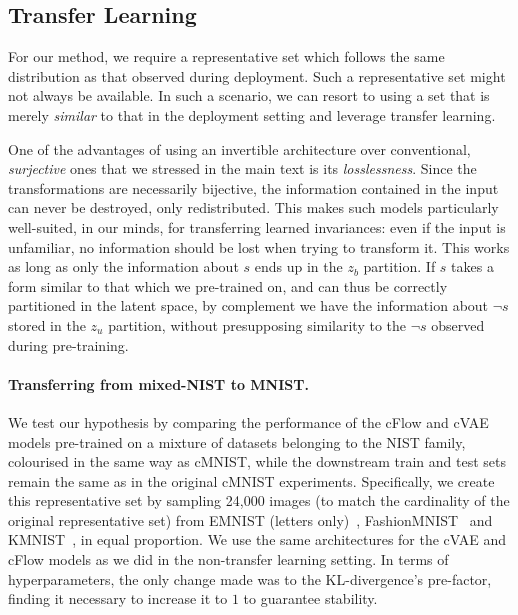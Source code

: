 \subsection{Transfer Learning}\label{sec:transfer-learning}
For our method, we require a representative set which follows the same distribution as that observed during deployment.
Such a representative set might not always be available.
In such a scenario, we can resort to using a set that is merely \emph{similar} to that in the deployment setting and leverage transfer learning.

One of the advantages of using an invertible architecture over conventional, \emph{surjective} ones that we stressed in the main text is its \emph{losslessness}. Since the transformations are necessarily bijective, the information contained in the input can never be destroyed, only redistributed. This makes such models particularly well-suited, in our minds, for transferring learned invariances:
even if the input is unfamiliar, no information should be lost when trying to transform it.
This works as long as only the information about $s$ ends up in the $z_b$ partition.
If $s$ takes a form similar to that which we pre-trained on, and can thus be correctly partitioned in the latent space, by complement we have the information about $\neg s$ stored in the $z_u$ partition, without presupposing similarity to the $\neg s$ observed during pre-training.

\paragraph{Transferring from mixed-NIST to MNIST.}
We test our hypothesis by comparing the performance of the cFlow and cVAE models pre-trained on a mixture of datasets belonging to the NIST family, colourised in the same way as cMNIST, while the downstream train and test sets remain the same as in the original cMNIST experiments. Specifically, we create this representative set by sampling 24,000 images (to match the cardinality of the original representative set) from EMNIST (letters only)~\cite{cohen2017emnist}, Fashion\-MNIST~\cite{xiao2017fashion} and KMNIST~\cite{clanuwat2018deep}, in equal proportion. We use the same architectures for the cVAE and cFlow models as we did in the non-transfer learning setting. In terms of hyperparameters, the only change made was to the KL-divergence's pre-factor, finding it necessary to increase it to $1$ to guarantee stability.

